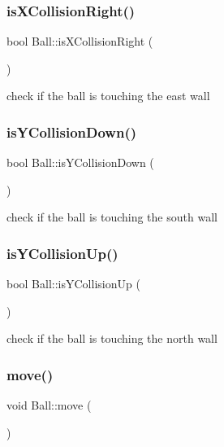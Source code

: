 \subsubsection{\texorpdfstring{is\+X\+Collision\+Right()}{isXCollisionRight()}}
{\footnotesize\ttfamily bool Ball\+::is\+X\+Collision\+Right (\begin{DoxyParamCaption}{ }\end{DoxyParamCaption})}

check if the ball is touching the east wall \mbox{\label{class_ball_a49aaf03314ad71ad8b549605683da5cf}} 
\subsubsection{\texorpdfstring{is\+Y\+Collision\+Down()}{isYCollisionDown()}}
{\footnotesize\ttfamily bool Ball\+::is\+Y\+Collision\+Down (\begin{DoxyParamCaption}{ }\end{DoxyParamCaption})}

check if the ball is touching the south wall \mbox{\label{class_ball_a89220468866f8bf347277e62b400cbd6}} 
\subsubsection{\texorpdfstring{is\+Y\+Collision\+Up()}{isYCollisionUp()}}
{\footnotesize\ttfamily bool Ball\+::is\+Y\+Collision\+Up (\begin{DoxyParamCaption}{ }\end{DoxyParamCaption})}

check if the ball is touching the north wall \mbox{\label{class_ball_a05228e822d67b25baf715cf09c325494}} 
\subsubsection{\texorpdfstring{move()}{move()}}
{\footnotesize\ttfamily void Ball\+::move (\begin{DoxyParamCaption}{ }\end{DoxyParamCaption})}

